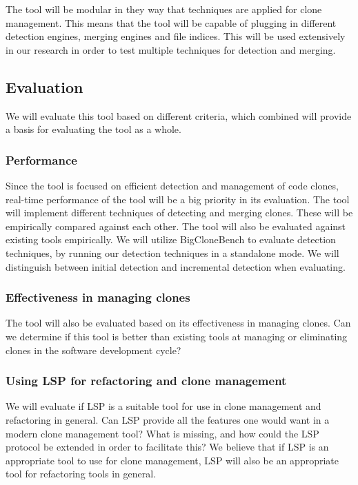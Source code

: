 \documentclass[12pt]{article}
\begin{document}
The tool will be modular in they way that techniques are applied for clone management. This
means that the tool will be capable of plugging in different detection engines, merging
engines and file indices. This will be used extensively in our research in order to test
multiple techniques for detection and merging.

\subsection{Evaluation}

We will evaluate this tool based on different criteria, which combined will provide a
basis for evaluating the tool as a whole.

\subsubsection{Performance}

Since the tool is focused on efficient detection and management of code clones, real-time
performance of the tool will be a big priority in its evaluation. The tool will implement
different techniques of detecting and merging clones. These will be empirically compared
against each other. The tool will also be evaluated against existing tools empirically. We
will utilize BigCloneBench\cite{BigCloneBench} to evaluate detection techniques, by
running our detection techniques in a standalone mode. We will distinguish between initial
detection and incremental detection when evaluating.

\subsubsection{Effectiveness in managing clones}

The tool will also be evaluated based on its effectiveness in managing clones. Can we
determine if this tool is better than existing tools at managing or eliminating clones in
the software development cycle?

\subsubsection{Using LSP for refactoring and clone management}

We will evaluate if LSP is a suitable tool for use in clone management and
refactoring in general. Can LSP provide all the features one would want in a modern clone
management tool? What is missing, and how could the LSP protocol be extended in order to
facilitate this? We believe that if LSP is an appropriate tool to use for clone
management, LSP will also be an appropriate tool for refactoring tools in general.

\newpage


\end{document}
